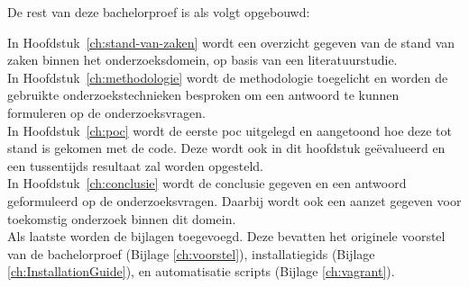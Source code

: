 
De rest van deze bachelorproef is als volgt opgebouwd:

In Hoofdstuk~\ref{ch:stand-van-zaken} wordt een overzicht gegeven van de stand van zaken binnen het onderzoeksdomein, op basis van een literatuurstudie.\\
In Hoofdstuk~\ref{ch:methodologie} wordt de methodologie toegelicht en worden de gebruikte onderzoekstechnieken besproken om een antwoord te kunnen formuleren op de onderzoeksvragen.\\
In Hoofdstuk~\ref{ch:poc} wordt de eerste \gls{poc} uitgelegd en aangetoond hoe deze tot stand is gekomen met de code. Deze wordt ook in dit hoofdstuk geëvalueerd en een tussentijds resultaat zal worden opgesteld.\\
In Hoofdstuk~\ref{ch:conclusie} wordt de conclusie gegeven en een antwoord geformuleerd op de onderzoeksvragen. Daarbij wordt ook een aanzet gegeven voor toekomstig onderzoek binnen dit domein.\\
Als laatste worden de bijlagen toegevoegd. Deze bevatten het originele voorstel van de bachelorproef (Bijlage \ref{ch:voorstel}), installatiegids (Bijlage \ref{ch:InstallationGuide}), en automatisatie scripts (Bijlage \ref{ch:vagrant}).